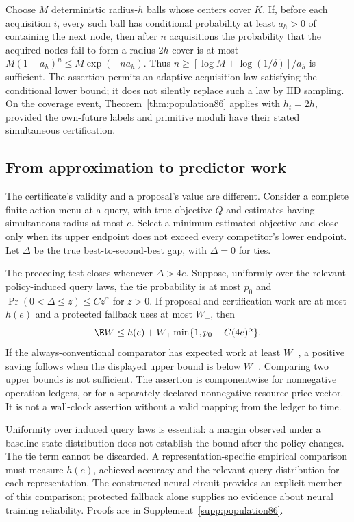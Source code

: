 \begin{proposition}\label{prop:coverage86}
Choose $M$ deterministic radius-$h$ balls whose centers cover $K$. If, before each acquisition $i$, every such ball has conditional probability at least $a_h>0$ of containing the next node, then after $n$ acquisitions the probability that the acquired nodes fail to form a radius-$2h$ cover is at most $M(1-a_h)^n\le M\exp(-na_h)$. Thus $n\ge[\log M+\log(1/\delta)]/a_h$ is sufficient. The assertion permits an adaptive acquisition law satisfying the conditional lower bound; it does not silently replace such a law by IID sampling. On the coverage event, Theorem~\ref{thm:population86} applies with $h_t=2h$, provided the own-future labels and primitive moduli have their stated simultaneous certification.
\end{proposition}

\subsection{From approximation to predictor work}
The certificate's validity and a proposal's value are different. Consider a complete finite action menu at a query, with true objective $Q$ and estimates having simultaneous radius at most $e$. Select a minimum estimated objective and close only when its upper endpoint does not exceed every competitor's lower endpoint. Let $\Delta$ be the true best-to-second-best gap, with $\Delta=0$ for ties.

\begin{proposition}\label{prop:work86}
The preceding test closes whenever $\Delta>4e$. Suppose, uniformly over the relevant policy-induced query laws, the tie probability is at most $p_0$ and $\Pr(0<\Delta\le z)\le Cz^\alpha$ for $z>0$. If proposal and certification work are at most $h(e)$ and a protected fallback uses at most $W_+$, then
\[
 \E W\le h(e)+W_+\min\{1,p_0+C(4e)^\alpha\}.
\]
If the always-conventional comparator has expected work at least $W_-$, a positive saving follows when the displayed upper bound is below $W_-$. Comparing two upper bounds is not sufficient. The assertion is componentwise for nonnegative operation ledgers, or for a separately declared nonnegative resource-price vector. It is not a wall-clock assertion without a valid mapping from the ledger to time.
\end{proposition}

Uniformity over induced query laws is essential: a margin observed under a baseline state distribution does not establish the bound after the policy changes. The tie term cannot be discarded. A representation-specific empirical comparison must measure $h(e)$, achieved accuracy and the relevant query distribution for each representation. The constructed neural circuit provides an explicit member of this comparison; protected fallback alone supplies no evidence about neural training reliability. Proofs are in Supplement~\ref{supp:population86}.
